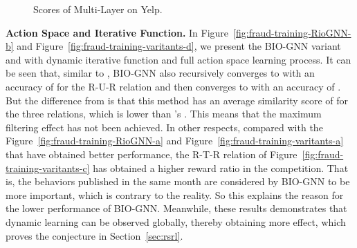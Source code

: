 \begin{comment}
\begin{figure}[h]
  \centering
  \texttt{[image: fig/scores\_yelp\_2layer.pdf]}
  \caption{Scores of Multi-Layer Rio-GNN on Yelp.}
  \label{fig:fraud-2layer-scores}
\end{figure}
\end{comment}


\begin{figure}[t]
\centering
{}\centering
\caption{Scores of Multi-Layer \RioGNN on Yelp.}\label{fig:fraud-2layer-scores}
\end{figure}


\textbf{Action Space and Iterative Function. }
In Figure~\ref{fig:fraud-training-RioGNN-b} and Figure~\ref{fig:fraud-training-varitants-d}, we present the BIO-GNN variant and \RioGNN with dynamic iterative function and full action space learning process.
It can be seen that, similar to \RioGNN, BIO-GNN also recursively converges to  with an accuracy of  for the R-U-R relation and then converges to  with an accuracy of .
But the difference from \RioGNN is that this method has an average similarity score of  for the three relations, which is lower than \RioGNN's .
This means that the maximum filtering effect has not been achieved. 
In other respects, compared with the Figure~\ref{fig:fraud-training-RioGNN-a} and Figure~\ref{fig:fraud-training-varitants-a} that have obtained better performance, the R-T-R relation of Figure~\ref{fig:fraud-training-varitants-c} has obtained a higher reward ratio in the competition. That is, the behaviors published in the same month are considered by BIO-GNN to be more important, which is contrary to the reality. So this explains the reason for the lower performance of BIO-GNN.
Meanwhile, these results demonstrates that dynamic learning can be observed globally, thereby obtaining more effect, which proves the conjecture in Section~\ref{sec:rsrl}.





